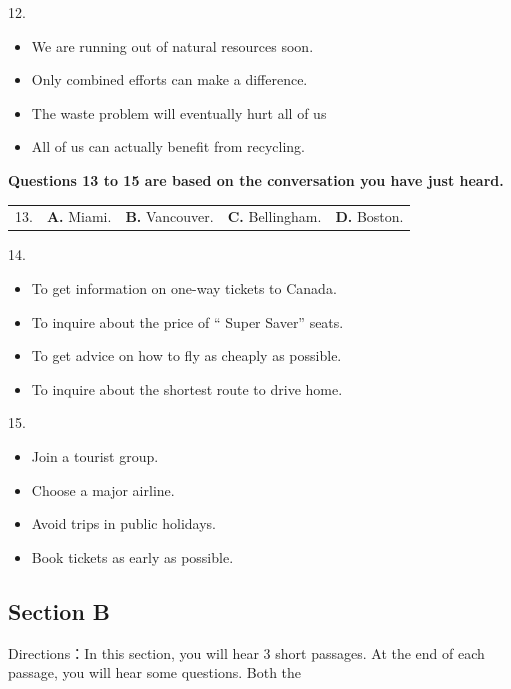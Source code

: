\documentclass[UTF8,11pt]{ctexart}
\begin{document}
12.


\begin{itemize}[leftmargin=2em,itemsep=.2em,topsep=.4em]\item[A.] We are running out of natural resources soon.
\item[B.] Only combined efforts can make a difference.
\item[C.] The waste problem will eventually hurt all of us
\item[D.] All of us can actually benefit from recycling.
\end{itemize}

\textbf{Questions 13 to 15 are based on the conversation you have just heard.}


\noindent\begin{tabularx}{\linewidth}{@{}lXXXX@{}}13. & \textbf{A.} Miami. & \textbf{B.} Vancouver. & \textbf{C.} Bellingham. & \textbf{D.} Boston.\\\end{tabularx}\par

14.


\begin{itemize}[leftmargin=2em,itemsep=.2em,topsep=.4em]\item[A.] To get information on one-way tickets to Canada.
\item[B.] To inquire about the price of “ Super Saver” seats.
\item[C.] To get advice on how to fly as cheaply as possible.
\item[D.] To inquire about the shortest route to drive home.
\end{itemize}

15.


\begin{itemize}[leftmargin=2em,itemsep=.2em,topsep=.4em]\item[A.] Join a tourist group.
\item[B.] Choose a major airline.
\item[C.] Avoid trips in public holidays.
\item[D.] Book tickets as early as possible.
\end{itemize}

\subsection*{Section B}


Directions：In this section, you will hear 3 short passages. At the end of each passage, you will hear some questions. Both the
\end{document}
